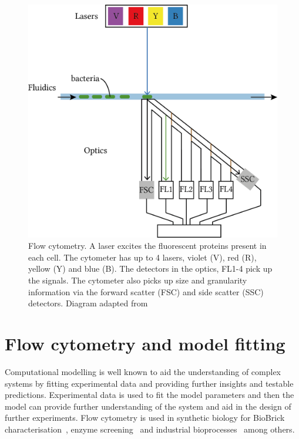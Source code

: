 \begin{figure}[tb]
	\begin{center}
		\includegraphics[scale=0.9]{../../chapters/chapterBackgr/images/flow-overview.png}
	\caption[Flow cytometry experimental setup]{\label{fig:flow_overv}Flow cytometry. A laser excites the fluorescent proteins present in each cell. The cytometer has up to 4 lasers, violet (V), red (R), yellow (Y) and blue (B). The detectors in the optics, FL1-4 pick up the signals. The cytometer also picks up size and granularity information via the forward scatter (FSC) and side scatter (SSC) detectors. Diagram adapted from~\autocite{FlowDiagram}}
	\end{center}
\end{figure}

\section{Flow cytometry and model fitting}

Computational modelling is well known to aid the understanding  of complex systems by fitting experimental data and providing further insights and testable predictions. Experimental data is used to fit the model parameters and then the model can provide further understanding of the system and aid in the design of further experiments. Flow cytometry is used in synthetic biology for BioBrick characterisation~\autocite{Kelly:2009bj}, enzyme screening~\autocite{Choi:2014gb} and industrial  bioprocesses~\autocite{Diaz:2010kw} among others. 


